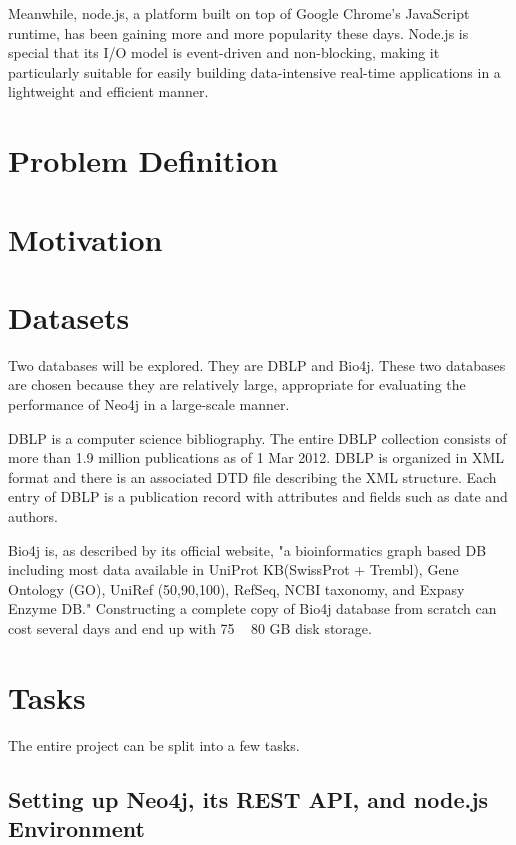 \documentclass[10pt, conference, compsocconf]{IEEEtran}
\begin{document}
Meanwhile, node.js, a platform built on top of Google Chrome's JavaScript runtime, has been gaining more and more popularity these days. Node.js is special that its I/O model is event-driven and non-blocking, making it particularly suitable for easily building data-intensive real-time applications in a lightweight and efficient manner. 



\section{Problem Definition}



\section{Motivation}



\section{Datasets}

Two databases will be explored. They are DBLP \citep{ley2006maintaining,Ley:2009:DLL:1687553.1687577} and Bio4j. These two databases are chosen because they are relatively large, appropriate for evaluating the performance of Neo4j in a large-scale manner.

DBLP is a computer science bibliography. The entire DBLP collection consists of more than 1.9 million publications as of 1 Mar 2012. DBLP is organized in XML format and there is an associated DTD file describing the XML structure. Each entry of DBLP is a publication record with attributes and fields such as date and authors.

Bio4j is, as described by its official website, "a bioinformatics graph based DB including most data available in UniProt KB(SwissProt + Trembl), Gene Ontology (GO), UniRef (50,90,100), RefSeq, NCBI taxonomy, and Expasy Enzyme DB." Constructing a complete copy of Bio4j database from scratch can cost several days and end up with 75 ~ 80 GB disk storage.

\section{Tasks}

The entire project can be split into a few tasks.

\subsection{Setting up Neo4j, its REST API, and node.js Environment}
\end{document}
